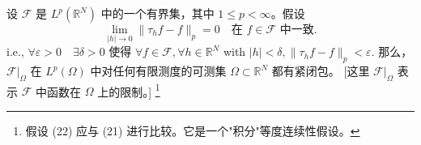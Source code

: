 \begin{theorem}\label{theorem4.26}
设 $\mathcal{F}$ 是 $L^p(\mathbb{R}^N)$ 中的一个有界集，其中 $1 \le p < \infty$。假设
\begin{equation}\label{eq:kolmogorov_riesz_frechet}
\lim_{|h| \to 0} \|\tau_h f - f\|_p = 0 \quad \text{在 } f \in \mathcal{F} \text{ 中一致}. \tag{22}
\end{equation}
i.e., $\forall \varepsilon > 0 \quad \exists \delta > 0$ 使得 $\forall f \in \mathcal{F}, \forall h \in \mathbb{R}^N$ with $|h| < \delta, \|\tau_h f - f\|_p < \varepsilon$.
那么，$\mathcal{F}|_\Omega$ 在 $L^p(\Omega)$ 中对任何有限测度的可测集 $\Omega \subset \mathbb{R}^N$ 都有紧闭包。
[这里 $\mathcal{F}|_\Omega$ 表示 $\mathcal{F}$ 中函数在 $\Omega$ 上的限制。]
\footnote{假设 (22) 应与 (21) 进行比较。它是一个"积分"等度连续性假设。}
\end{theorem}
